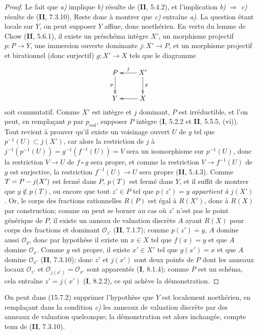 \begin{proof}
Le fait que \emph{a)} implique \emph{b)} résulte de (\textbf{II}, 5.4.2), et l'implication \emph{b)} $\Rightarrow$ \emph{c)} résulte de (\textbf{II}, 7.3.10). Reste donc à montrer que \emph{c)} entraîne \emph{a)}. La question étant locale sur $Y$, on peut supposer $Y$ affine, donc noethérien. En vertu du lemme de Chow (\textbf{II}, 5.6.1), il existe un préschéma intègre $X'$, un morphisme projectif $p:P\to Y$, une immersion ouverte dominante $j:X'\to P$, et un morphisme projectif et birationnel (donc surjectif) $g:X'\to X$ tels que le diagramme
\[
\xymatrix{
P\ar[d]_-{p} & X'\ar[l]_-{j}\ar[d]^-{g}\\
Y & X\ar[l]
}
\]
soit commutatif. Comme $X'$ est intègre et $j$ dominant, $P$ est irréductible, et l'on peut, en remplaçant $p$ par $p_{\mathrm{red}}$, supposer $P$ intègre (\textbf{I}, 5.2.2 et \textbf{II}, 5.5.5, (vi)). Tout revient à prouver qu'il existe un voisinage ouvert $U$ de $y$ tel que $p^{-1}(U)\subset j(X')$, car alors la restriction de $j$ à
$j^{-1}(p^{-1}(U))=g^{-1}(f^{-1}(U))=V$
sera un isomorphisme sur $p^{-1}(U)$, donc la restriction $V\to U$ de $f\circ g$ sera propre, et comme la restriction $V\to f^{-1}(U)$ de $g$ est surjective, la restriction $f^{-1}(U)\to U$ sera propre (\textbf{II}, 5.4.3). Comme $T=P- j(X')$ est fermé dans $P$, $p(T)$ est fermé dans $Y$, et il suffit de montrer que $y\notin p(T)$, ou encore que tout $z'\in P$ tel que $p(z')=y$ \emph{appartient à} $j(X')$. Or, le corps des fractions rationnelles $R(P)$ est égal à $R(X')$, donc à $R(X)$ par construction; comme on peut se borner au cas où $z'$ n'est pas le point générique de $P$, il existe un anneau de valuation discrète $A$ ayant $R(X)$ pour corps des fractions et dominant $\mathcal O_{z'}$ (\textbf{II}, 7.1.7); comme $p(z')=y$, $A$ domine aussi $\mathcal O_y$, donc par hypothèse il existe un $x\in X$ tel que $f(x)=y$ et que $A$ domine $\mathcal O_x$. Comme $g$ est propre, il existe $x'\in X'$ tel que $g(x')=x$ et que $A$ domine $\mathcal O_{x'}$ (\textbf{II}, 7.3.10); donc $z'$ et $j(x')$ sont deux points de $P$ dont les anneaux locaux $\mathcal O_{z'}$ et $\mathcal O_{j(x')}=\mathcal O_{x'}$ sont apparentés (\textbf{I}, 8.1.4); comme $P$ est un schéma, cela entraîne $z'=j(x')$ (\textbf{I}, 8.2.2), ce qui achève la démonstration.
\end{proof}

\begin{remark}[15.7.3]
\label{IV.15.7.3-fr}
On peut dans (15.7.2) supprimer l'hypothèse que $Y$ est localement noethérien, en remplaçant dans la condition \emph{c)} les anneaux de valuation discrète par des anneaux de valuation quelconque; la démonstration est alors inchangée, compte tenu de (\textbf{II}, 7.3.10).
\end{remark}

